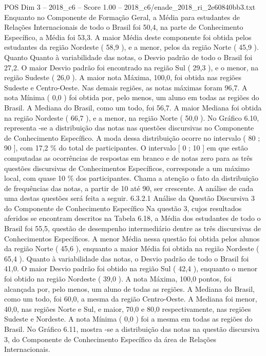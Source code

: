 \begin{textsample}{POS Dim 3 – 2018\_c6 – Score 1.00 – 2018\_c6/enade\_2018\_ri\_2e60840bb3.txt}
Enquanto no Componente de Formação Geral, a Média para estudantes de Relações Internacionais de todo o Brasil foi 50,4, na parte de Conhecimento Específico, a Média foi 53,3.
A maior Média deste componente foi obtida pelos estudantes da região Nordeste ( 58,9 ), e a menor, pelos da região Norte ( 45,9 ).
Quanto Quanto à variabilidade das notas, o Desvio padrão de todo o Brasil foi 27,2.
O maior Desvio padrão foi encontrado na região Sul ( 29,3 ), e o menor, na região Sudeste ( 26,0 ).
A maior nota Máxima, 100,0, foi obtida nas regiões Sudeste e Centro-Oeste.
Nas demais regiões, as notas máximas foram 96,7.
A nota Mínima ( 0,0 ) foi obtida por, pelo menos, um aluno em todas as regiões do Brasil.
A Mediana do Brasil, como um todo, foi 56,7.
A maior Mediana foi obtida na região Nordeste ( 66,7 ), e a menor, na região Norte ( 50,0 ).
No Gráfico 6.10, representa -se a distribuição das notas nas questões discursivas no Componente de Conhecimento Específico.
A moda dessa distribuição ocorre no intervalo ( 80 ; 90 ], com 17,2 \% do total de participantes.
O intervalo [ 0 ; 10 ] em que estão computadas as ocorrências de respostas em branco e de notas zero para as três questões discursivas de Conhecimentos Específicos, corresponde a um máximo local, com quase 10 \% dos participantes.
Chama a atenção o fato da distribuição de frequências das notas, a partir de 10 até 90, ser crescente.
A análise de cada uma destas questões será feita a seguir. 6.3.2.1 Análise da Questão Discursiva 3 do Componente de Conhecimento Específico Na questão 3, cujos resultados aferidos se encontram descritos na Tabela 6.18, a Média dos estudantes de todo o Brasil foi 55,5, questão de desempenho intermediário dentre as três discursivas de Conhecimentos Específicos.
A menor Média nessa questão foi obtida pelos alunos da região Norte ( 45,6 ), enquanto a maior Média foi obtida na região Nordeste ( 65,4 ).
Quanto à variabilidade das notas, o Desvio padrão de todo o Brasil foi 41,0.
O maior Desvio padrão foi obtido na região Sul ( 42,4 ), enquanto o menor foi obtido na região Nordeste ( 39,0 ).
A nota Máxima, 100,0 pontos, foi alcançada por, pelo menos, um aluno de todas as regiões.
A Mediana do Brasil, como um todo, foi 60,0, a mesma da região Centro-Oeste.
A Mediana foi menor, 40,0, nas regiões Norte e Sul, e maior, 70,0 e 80,0 respectivamente, nas regiões Sudeste e Nordeste.
A nota Mínima ( 0,0 ) foi a mesma em todas as regiões do Brasil.
No Gráfico 6.11, mostra -se a distribuição das notas na questão discursiva 3, do Componente de Conhecimento Específico da área de Relações Internacionais.

\end{textsample}
